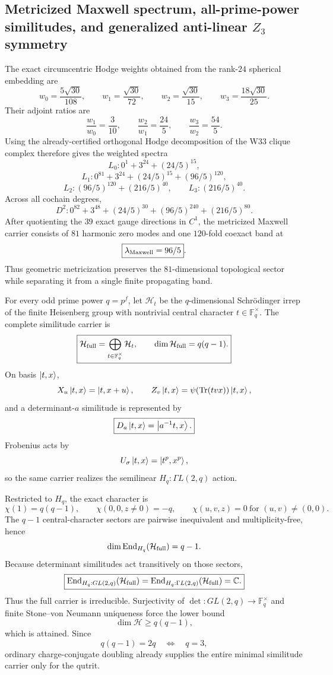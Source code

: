 \subsection*{Metricized Maxwell spectrum, all-prime-power similitudes, and generalized anti-linear $Z_3$ symmetry}

The exact circumcentric Hodge weights obtained from the rank-$24$ spherical
embedding are
\[
w_0=\frac{5\sqrt{30}}{108},\qquad
w_1=\frac{\sqrt{30}}{72},\qquad
w_2=\frac{\sqrt{30}}{15},\qquad
w_3=\frac{18\sqrt{30}}{25}.
\]
Their adjoint ratios are
\[
\boxed{
\frac{w_1}{w_0}=\frac3{10},\qquad
\frac{w_2}{w_1}=\frac{24}{5},\qquad
\frac{w_3}{w_2}=\frac{54}{5}.
}
\]
Using the already-certified orthogonal Hodge decomposition of the W33 clique
complex therefore gives the weighted spectra
\[
L_0:0^1+3^{24}+(24/5)^{15},
\]
\[
\boxed{
L_1:0^{81}+3^{24}+(24/5)^{15}+(96/5)^{120},
}
\]
\[
L_2:(96/5)^{120}+(216/5)^{40},
\qquad
L_3:(216/5)^{40}.
\]
Across all cochain degrees,
\[
\boxed{
D^2:
0^{82}+3^{48}+(24/5)^{30}+(96/5)^{240}+(216/5)^{80}.
}
\]
After quotienting the $39$ exact gauge directions in $C^1$, the metricized
Maxwell carrier consists of $81$ harmonic zero modes and one $120$-fold
coexact band at
\[
\boxed{\lambda_{\rm Maxwell}=96/5}.
\]
Thus geometric metricization preserves the $81$-dimensional topological sector
while separating it from a single finite propagating band.

For every odd prime power $q=p^f$, let $\mathcal H_t$ be the
$q$-dimensional Schr\"odinger irrep of the finite Heisenberg group with
nontrivial central character $t\in\mathbb F_q^\times$.  The complete
similitude carrier is
\[
\boxed{
\mathcal H_{\rm full}
=
\bigoplus_{t\in\mathbb F_q^\times}\mathcal H_t,
\qquad
\dim\mathcal H_{\rm full}=q(q-1).
}
\]
On basis $\left|t,x\right\rangle$,
\[
X_u\left|t,x\right\rangle=\left|t,x+u\right\rangle,
\qquad
Z_v\left|t,x\right\rangle
=
\psi\!\left(
\operatorname{Tr}(tvx)
\right)\left|t,x\right\rangle,
\]
and a determinant-$a$ similitude is represented by
\[
\boxed{
D_a\left|t,x\right\rangle=\left|a^{-1}t,x\right\rangle.
}
\]
Frobenius acts by
\[
U_\sigma\left|t,x\right\rangle=\left|t^p,x^p\right\rangle,
\]
so the same carrier realizes the semilinear
$H_q:\Gamma L(2,q)$ action.

Restricted to $H_q$, the exact character is
\[
\boxed{
\chi(1)=q(q-1),\qquad
\chi(0,0,z\ne0)=-q,\qquad
\chi(u,v,z)=0\ \text{for }(u,v)\ne(0,0).
}
\]
The $q-1$ central-character sectors are pairwise inequivalent and
multiplicity-free, hence
\[
\dim\operatorname{End}_{H_q}(\mathcal H_{\rm full})=q-1.
\]
Because determinant similitudes act transitively on those sectors,
\[
\boxed{
\operatorname{End}_{H_q:GL(2,q)}(\mathcal H_{\rm full})
=
\operatorname{End}_{H_q:\Gamma L(2,q)}(\mathcal H_{\rm full})
=
\mathbb C.
}
\]
Thus the full carrier is irreducible.  Surjectivity of
$\det:GL(2,q)\to\mathbb F_q^\times$ and finite Stone--von Neumann
uniqueness force the lower bound
\[
\boxed{\dim\mathcal H\ge q(q-1),}
\]
which is attained.  Since
\[
q(q-1)=2q
\quad\Longleftrightarrow\quad
q=3,
\]
ordinary charge-conjugate doubling already supplies the entire minimal
similitude carrier only for the qutrit.

